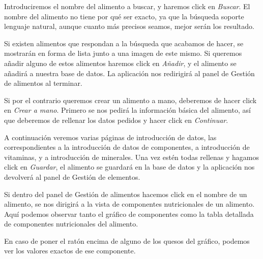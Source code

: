 Introduciremos el nombre del alimento a buscar, y haremos click en \textit{Buscar}. El nombre del alimento no tiene por qué ser exacto, ya que la búsqueda soporte lenguaje natural, aunque cuanto más precisos seamos, mejor serán los resultado.

Si existen alimentos que respondan a la búsqueda que acabamos de hacer, se mostrarán en forma de lista junto a una imagen de este mismo. Si queremos añadir alguno de estos alimentos haremos click en \textit{Añadir}, y el alimento se añadirá a nuestra base de datos. La aplicación nos redirigirá al panel de Gestión de alimentos al terminar.


Si por el contrario queremos crear un alimento a mano, deberemos de hacer click en \textit{Crear a mano}. Primero se nos pedirá la información básica del alimento, así que deberemos de rellenar los datos pedidos y hacer click en \textit{Continuar}. 

A continuación veremos varias páginas de introducción de datos, las correspondientes a la introducción de datos de componentes, a introducción de vitaminas, y a introducción de minerales. Una vez estén todas rellenas y hagamos click en \textit{Guardar}, el alimento se guardará en la base de datos y la aplicación nos devolverá al panel de Gestión de elementos.





Si dentro del panel de Gestión de alimentos hacemos click en el nombre de un alimento, se nos dirigirá a la vista de componentes nutricionales de un alimento. Aquí podemos observar tanto el gráfico de componentes como la tabla detallada de componentes nutricionales del alimento.


En caso de poner el ratón encima de alguno de los quesos del gráfico, podemos ver los valores exactos de ese componente.

